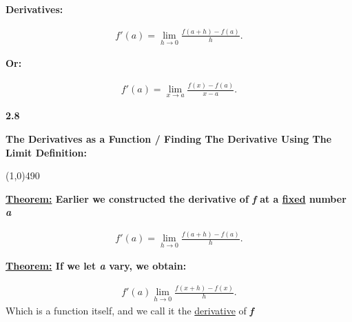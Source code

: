 \documentclass{report}
\begin{document}
        \bigbreak \noindent \bigbreak \noindent 
        \begin{large}
            \textbf{Derivatives:}
        \end{large}
        \bigbreak \noindent 
        \begin{align*}
            f\prime (a) = \lim\limits_{h \to 0}{ \frac{f(a+h) - f(a)}{h}}
        .\end{align*}
        \bigbreak \noindent 
        \begin{center}
            \textbf{Or:}
        \end{center}
        \begin{align*}
            f\prime (a) = \lim\limits_{x \to a}{ \frac{f(x) - f(a)}{x-a}}
        .\end{align*}

        \pagebreak \bigbreak \noindent
        \begin{Large}
            \begin{mdframed}
                \begin{center}
                    \textbf{2.8}
                \end{center}
            \end{mdframed}
        \end{Large}
        \begin{Large}
            \begin{center}
                \textbf{The Derivatives as a Function / Finding The Derivative Using The Limit Definition:}
            \end{center}
        \end{Large}
        \line(1,0){490}

        \bigbreak \noindent \bigbreak \noindent \bigbreak \noindent 
        \begin{mdframed}
            \textbf{\underline{Theorem:} Earlier we constructed the derivative of \textit{f} at a \underline{fixed} number \textbf{\textit{a}} }		
        \end{mdframed}
        \begin{align*}
            f\prime(a) = \lim\limits_{h \to 0}{ \frac{f(a+h) - f(a)}{h}}
        .\end{align*}
        \bigbreak \noindent 
        \begin{mdframed}
            \textbf{\underline{Theorem:} If we let \textbf{\textit{a}} vary, we obtain:}		
        \end{mdframed}
        \begin{align*}
            f\prime(a) \lim\limits_{h \to 0}{ \frac{f(x+h) - f(x)}{h}}
        .\end{align*}
        \bigbreak \noindent 
        Which is a function itself, and we call it the \underline{derivative} of \textbf{\textit{f}}
        
\end{document}
